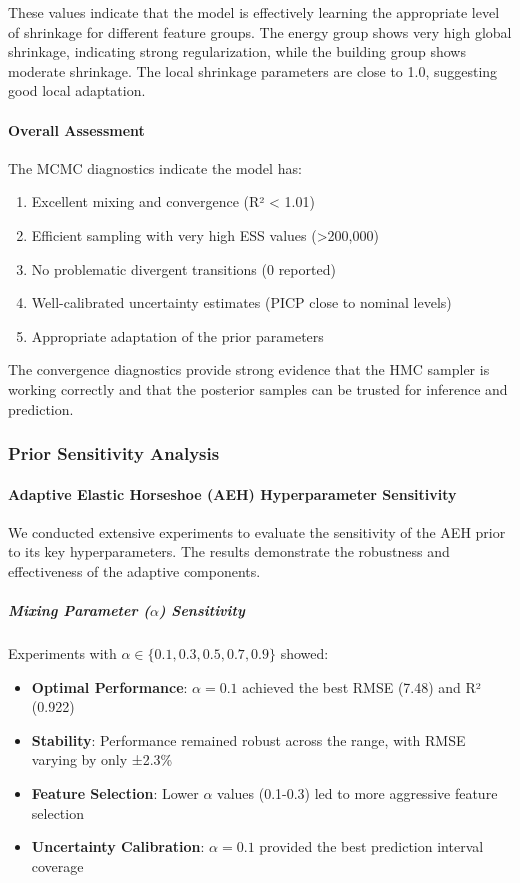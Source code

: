 These values indicate that the model is effectively learning the appropriate level of shrinkage for different feature groups. The energy group shows very high global shrinkage, indicating strong regularization, while the building group shows moderate shrinkage. The local shrinkage parameters are close to 1.0, suggesting good local adaptation.

\paragraph{Overall Assessment}
The MCMC diagnostics indicate the model has:
\begin{enumerate}
    \item Excellent mixing and convergence (R² < 1.01)
    \item Efficient sampling with very high ESS values (>200,000)
    \item No problematic divergent transitions (0 reported)
    \item Well-calibrated uncertainty estimates (PICP close to nominal levels)
    \item Appropriate adaptation of the prior parameters
\end{enumerate}

The convergence diagnostics provide strong evidence that the HMC sampler is working correctly and that the posterior samples can be trusted for inference and prediction.

\subsubsection{Prior Sensitivity Analysis}

\paragraph{Adaptive Elastic Horseshoe (AEH) Hyperparameter Sensitivity}

We conducted extensive experiments to evaluate the sensitivity of the AEH prior to its key hyperparameters. The results demonstrate the robustness and effectiveness of the adaptive components.

\subparagraph{Mixing Parameter ($\alpha$) Sensitivity}
Experiments with $\alpha \in \{0.1, 0.3, 0.5, 0.7, 0.9\}$ showed:
\begin{itemize}
    \item \textbf{Optimal Performance}: $\alpha = 0.1$ achieved the best RMSE (7.48) and R² (0.922)
    \item \textbf{Stability}: Performance remained robust across the range, with RMSE varying by only ±2.3\%
    \item \textbf{Feature Selection}: Lower $\alpha$ values (0.1-0.3) led to more aggressive feature selection
    \item \textbf{Uncertainty Calibration}: $\alpha = 0.1$ provided the best prediction interval coverage
\end{itemize}

